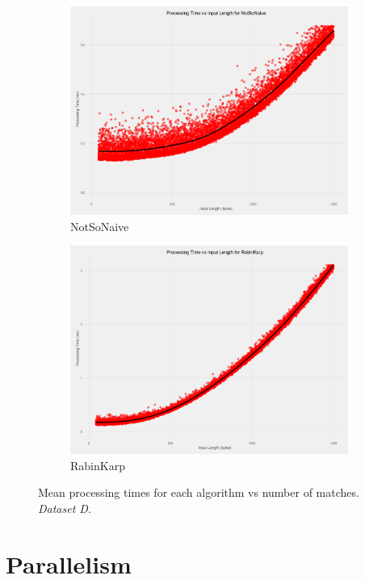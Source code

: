 \documentclass[11pt]{article}
\begin{document}
\begin{figure}[!htb]
\begin{subfigure}[b]{0.48\textwidth}
      \includegraphics[width=\textwidth]{images/processing_speed_vs_input_length_no_matches_NotSoNaive}
      \caption{NotSoNaive}
  \end{subfigure}
  \begin{subfigure}[b]{0.48\textwidth}
      \includegraphics[width=\textwidth]{images/processing_speed_vs_input_length_no_matches_RabinKarp}
      \caption{RabinKarp}
  \end{subfigure}
  \caption{Mean processing times for each algorithm vs number of matches. \textit{Dataset D}.}
  \label{figure-individualalgorithmsvsnumberofmatches}
\end{figure}


\section{Parallelism}




\end{document}
